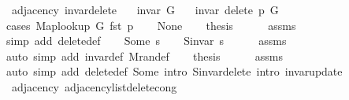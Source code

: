 \begin{isabellebody}
\isanewline
{}\isamarkupfalse%
\ {\isacharparenleft}{\kern0pt}\ adjacency{\isacharparenright}{\kern0pt}\ invar{\isacharunderscore}{\kern0pt}delete{\isacharcolon}{\kern0pt}\isanewline
\ \ \ {\isachardoublequoteopen}invar\ G{\isachardoublequoteclose}\isanewline
\ \ \ {\isachardoublequoteopen}invar\ {\isacharparenleft}{\kern0pt}delete\ p\ G{\isacharparenright}{\kern0pt}{\isachardoublequoteclose}\isanewline
%
\isadelimproof
%
\endisadelimproof
%
\isatagproof
{}\isamarkupfalse%
\ {\isacharparenleft}{\kern0pt}cases\ {\isachardoublequoteopen}Map{\isacharunderscore}{\kern0pt}lookup\ G\ {\isacharparenleft}{\kern0pt}fst\ p{\isacharparenright}{\kern0pt}{\isachardoublequoteclose}{\isacharparenright}{\kern0pt}\isanewline
\ \ \isamarkupfalse%
\ None\isanewline
\ \ \isamarkupfalse%
\ {\isacharquery}{\kern0pt}thesis\isanewline
\ \ \ \ \isamarkupfalse%
\ assms\isanewline
\ \ \ \ \isamarkupfalse%
\ {\isacharparenleft}{\kern0pt}simp\ add{\isacharcolon}{\kern0pt}\ delete{\isacharunderscore}{\kern0pt}def{\isacharparenright}{\kern0pt}\isanewline
{}\isamarkupfalse%
\isanewline
\ \ \isamarkupfalse%
\ {\isacharparenleft}{\kern0pt}Some\ s{\isacharparenright}{\kern0pt}\isanewline
\ \ \isamarkupfalse%
\ {\isachardoublequoteopen}S{\isachardot}{\kern0pt}invar\ s{\isachardoublequoteclose}\isanewline
\ \ \ \ \isamarkupfalse%
\ assms\isanewline
\ \ \ \ \isamarkupfalse%
\ {\isacharparenleft}{\kern0pt}auto\ simp\ add{\isacharcolon}{\kern0pt}\ invar{\isacharunderscore}{\kern0pt}def\ M{\isachardot}{\kern0pt}ran{\isacharunderscore}{\kern0pt}def{\isacharparenright}{\kern0pt}\isanewline
\ \ \isamarkupfalse%
\ {\isacharquery}{\kern0pt}thesis\isanewline
\ \ \ \ \isamarkupfalse%
\ assms\isanewline
\ \ \ \ \isamarkupfalse%
\ {\isacharparenleft}{\kern0pt}auto\ simp\ add{\isacharcolon}{\kern0pt}\ delete{\isacharunderscore}{\kern0pt}def\ Some\ intro{\isacharcolon}{\kern0pt}\ S{\isachardot}{\kern0pt}invar{\isacharunderscore}{\kern0pt}delete\ intro{\isacharcolon}{\kern0pt}\ invar{\isacharunderscore}{\kern0pt}update{\isacharparenright}{\kern0pt}\isanewline
{}\isamarkupfalse%
%
\endisatagproof
{\isafoldproof}%
%
\isadelimproof
\isanewline
%
\endisadelimproof
\isanewline
{}\isamarkupfalse%
\ {\isacharparenleft}{\kern0pt}\ adjacency{\isacharparenright}{\kern0pt}\ adjacency{\isacharunderscore}{\kern0pt}list{\isacharunderscore}{\kern0pt}delete{\isacharunderscore}{\kern0pt}cong{\isacharcolon}{\kern0pt}\isanewline

\end{isabellebody}
